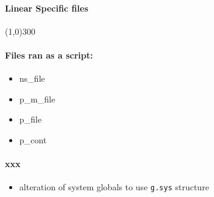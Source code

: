 \documentclass[12pt]{article}
\begin{document}
\paragraph{Linear Specific files}\line(1,0){300}

\paragraph{Files ran as a script:}
	\begin{itemize}
		\item ns\_file
		\item p\_m\_file
		\item p\_file
		\item p\_cont
	\end{itemize}
	
\paragraph{xxx}
	\begin{itemize}
		\item alteration of system globals to use \verb|g.sys| structure
	\end{itemize}

\end{document}
